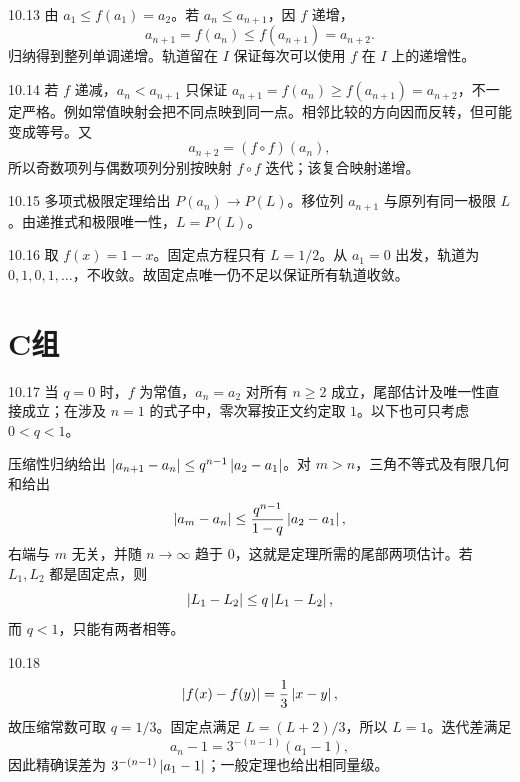 \begin{solution}{10.13}
由 \(a_1\le f(a_1)=a_2\)。若 \(a_n\le a_{n+1}\)，因 \(f\) 递增，
\[
 a_{n+1}=f(a_n)\le f(a_{n+1})=a_{n+2}.
\]
归纳得到整列单调递增。轨道留在 \(I\) 保证每次可以使用 \(f\) 在 \(I\) 上的递增性。
\end{solution}

\begin{solution}{10.14}
若 \(f\) 递减，\(a_n<a_{n+1}\) 只保证
\(a_{n+1}=f(a_n)\ge f(a_{n+1})=a_{n+2}\)，不一定严格。例如常值映射会把不同点映到同一点。相邻比较的方向因而反转，但可能变成等号。又
\[
 a_{n+2}=(f\circ f)(a_n),
\]
所以奇数项列与偶数项列分别按映射 \(f\circ f\) 迭代；该复合映射递增。
\end{solution}

\begin{solution}{10.15}
多项式极限定理给出 \(P(a_n)\to P(L)\)。移位列 \(a_{n+1}\) 与原列有同一极限 \(L\)。由递推式和极限唯一性，\(L=P(L)\)。
\end{solution}

\begin{solution}{10.16}
取 \(f(x)=1-x\)。固定点方程只有 \(L=1/2\)。从 \(a_1=0\) 出发，轨道为
\(0,1,0,1,\ldots\)，不收敛。故固定点唯一仍不足以保证所有轨道收敛。
\end{solution}

\section*{C组}

\begin{solution}{10.17}
当 \(q=0\) 时，\(f\) 为常值，\(a_n=a_2\) 对所有 \(n\ge2\) 成立，尾部估计及唯一性直接成立；在涉及 \(n=1\) 的式子中，零次幂按正文约定取 \(1\)。以下也可只考虑 \(0<q<1\)。

压缩性归纳给出
\(\left|a_{n+1}-a_n\right|\le q^{n-1}\left|a_2-a_1\right|\)。对 \(m>n\)，三角不等式及有限几何和给出
\[
 \left|a_m-a_n\right|
 \le\frac{q^{n-1}}{1-q}\left|a_2-a_1\right|,
\]
右端与 \(m\) 无关，并随 \(n\to\infty\) 趋于 \(0\)，这就是定理所需的尾部两项估计。若 \(L_1,L_2\) 都是固定点，则
\[
 \left|L_1-L_2\right|\le q\left|L_1-L_2\right|,
\]
而 \(q<1\)，只能有两者相等。
\end{solution}

\begin{solution}{10.18}
\[
 \left|f(x)-f(y)\right|=\frac13\left|x-y\right|,
\]
故压缩常数可取 \(q=1/3\)。固定点满足 \(L=(L+2)/3\)，所以 \(L=1\)。迭代差满足
\[
 a_n-1=3^{-(n-1)}(a_1-1),
\]
因此精确误差为 \(3^{-(n-1)}\left|a_1-1\right|\)；一般定理也给出相同量级。
\end{solution}

